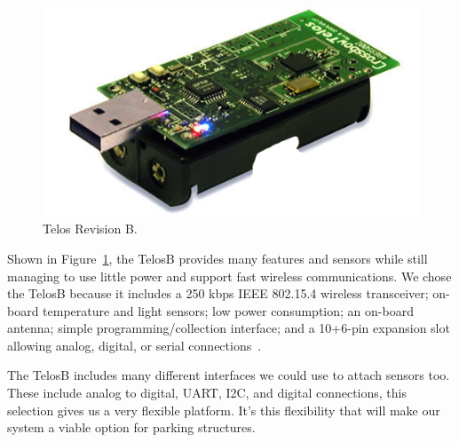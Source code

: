 \documentclass{acm_proc}
\begin{document}
\begin{figure}
    \begin{center}
		\includegraphics[width=\columnwidth]{figures/telosb}
	\end{center}
	\caption{Telos Revision B.}
	\label{fig:telosb}
\end{figure}

Shown in Figure~\ref{fig:telosb}, the TelosB provides many
features and sensors while still managing to use little power and support
fast wireless communications.  We chose the TelosB because it includes a
250 kbps IEEE 802.15.4 wireless transceiver; on-board temperature and light
sensors; low power consumption; an on-board antenna; simple
programming/collection interface; and a 10+6-pin expansion slot allowing
analog, digital, or serial connections~\cite{moteiv:telosb}.

The TelosB includes many different interfaces we could use to attach
sensors too.
These include analog to digital, UART, I2C, and digital connections, this
selection gives us a very flexible platform.
It's this flexibility that will make our system a viable option for parking
structures.
\end{document}
